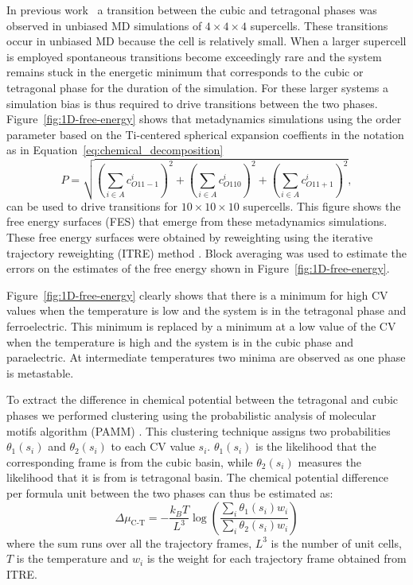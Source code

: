 In previous work~\cite{gigli_thermodynamics_2022} a transition between the cubic and tetragonal phases was observed in unbiased MD simulations of $4\times4\times4$ supercells.  These transitions occur in unbiased MD because the cell is relatively small.  When a larger supercell is employed spontaneous transitions become exceedingly rare and the system remains stuck in the energetic minimum that corresponds to the cubic or tetragonal phase for the duration of the simulation.  For these larger systems a simulation bias is thus required to drive transitions between the two phases. Figure~\ref{fig:1D-free-energy} shows that metadynamics simulations using the order parameter based on the Ti-centered spherical expansion coeffients in the notation as in Equation~\eqref{eq:chemical_decomposition}
\begin{equation}
  P = \sqrt{(\sum_{i\in A} c_{O11-1}^i)^2 + (\sum_{i\in A} c_{O110}^i)^2 + (\sum_{i\in A} c_{O11+1}^i)^2}, 
\end{equation}
can be used to drive  transitions for $10\times10\times10$ supercells. This figure shows the free energy surfaces (FES) that emerge from these metadynamics simulations. These free energy surfaces were obtained by reweighting using the iterative trajectory reweighting (ITRE) method \cite{giberti_iterative_2020}.  Block averaging was used to estimate the errors on the estimates of the free energy shown in Figure~\ref{fig:1D-free-energy}. 

Figure~\ref{fig:1D-free-energy} clearly shows that there is a minimum for high CV values when the temperature is low and the system is in the tetragonal phase and ferroelectric. This minimum is replaced by a minimum at a low value of the CV when the temperature is high and the system is in the cubic phase and paraelectric.  At intermediate temperatures two minima are observed as one phase is metastable.

To extract the difference in chemical potential between the tetragonal and cubic phases we performed clustering using the probabilistic analysis of molecular motifs algorithm (PAMM) \cite{gasp+18jctc}. This clustering technique assigns two probabilities $\theta_1(s_i)$ and $\theta_2(s_i)$ to each CV value $s_i$.  $\theta_1(s_i)$ is the likelihood that the corresponding frame is from the cubic basin, while  $\theta_2(s_i)$ measures the likelihood that it is from is tetragonal basin. The chemical potential difference per formula unit between the two phases can thus be estimated as:
$$
\Delta\mu_{\textrm{C-T}} = -\frac{k_B T}{L^3} \log \left( \frac{\sum_i \theta_1(s_i) w_i}{\sum_i \theta_2(s_i) w_i} \right) 
$$
where the sum runs over all the trajectory frames, $L^3$ is the number of unit cells, $T$ is the temperature and $w_i$ is the weight for each trajectory frame obtained from ITRE.  

